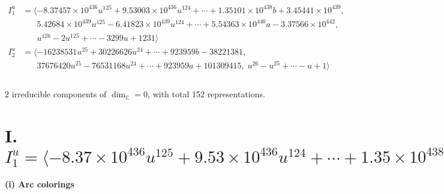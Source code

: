 \documentclass[1p]{elsarticle_modified}
\theoremstyle{definition}
\begin{document}
\begin{align*}
I^u_{1}&=\langle 
-8.37457\times10^{436} u^{125}+9.53003\times10^{436} u^{124}+\cdots+1.35101\times10^{438} b+3.45441\times10^{439},\\
\phantom{I^u_{1}}&\phantom{= \langle  }5.42684\times10^{439} u^{125}-6.41823\times10^{439} u^{124}+\cdots+5.54363\times10^{440} a-3.37566\times10^{442},\\
\phantom{I^u_{1}}&\phantom{= \langle  }u^{126}-2 u^{125}+\cdots-3299 u+1231\rangle \\
I^u_{2}&=\langle 
-16238531 u^{25}+30226626 u^{24}+\cdots+923959 b-38221381,\\
\phantom{I^u_{2}}&\phantom{= \langle  }37676420 u^{25}-76531168 u^{24}+\cdots+923959 a+101309415,\;u^{26}- u^{25}+\cdots- u+1\rangle \\
\\
\end{align*}
\raggedright * 2 irreducible components of $\dim_{\mathbb{C}}=0$, with total 152 representations.\\
\newpage
\renewcommand{\arraystretch}{1}
\centering \section*{I. $I^u_{1}= \langle -8.37\times10^{436} u^{125}+9.53\times10^{436} u^{124}+\cdots+1.35\times10^{438} b+3.45\times10^{439},\;5.43\times10^{439} u^{125}-6.42\times10^{439} u^{124}+\cdots+5.54\times10^{440} a-3.38\times10^{442},\;u^{126}-2 u^{125}+\cdots-3299 u+1231 \rangle$}
\flushleft \textbf{(i) Arc colorings}\\
\end{document}
